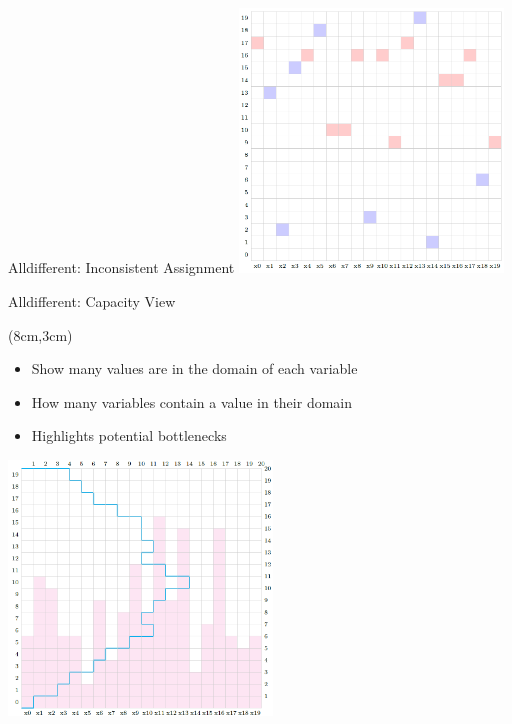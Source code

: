 \begin{frame}{Alldifferent: Inconsistent Assignment}
\includegraphics[width=7cm]{images/aldifferentconflict.PNG}    
\end{frame}

\begin{frame}{Alldifferent: Capacity View}
\begin{textblock*}{7cm}(8cm,3cm)
\begin{itemize}
    \item Show many values are in the domain of each variable
    \item How many variables contain a value in their domain
    \item Highlights potential bottlenecks
\end{itemize}
\end{textblock*}
\includegraphics[width=7cm]{images/alldifferentcapacity.PNG}    
\end{frame}


